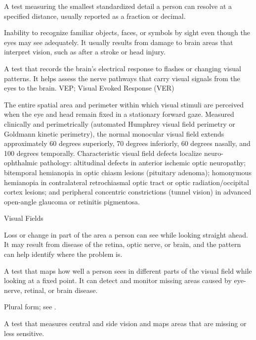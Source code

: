  A test measuring the smallest standardized detail a person can resolve at a specified distance, usually reported as a fraction or decimal.

 Inability to recognize familiar objects, faces, or symbols by sight even though the eyes may see adequately. It usually results from damage to brain areas that interpret vision, such as after a stroke or head injury.

 A test that records the brain’s electrical response to flashes or changing visual patterns. It helps assess the nerve pathways that carry visual signals from the eyes to the brain.
\synonyms
VEP; Visual Evoked Response (VER)

 The entire spatial area and perimeter within which visual stimuli are perceived when the eye and head remain fixed in a stationary forward gaze. Measured clinically and perimetrically (automated Humphrey visual field perimetry or Goldmann kinetic perimetry), the normal monocular visual field extends approximately 60 degrees superiorly, 70 degrees inferiorly, 60 degrees nasally, and 100 degrees temporally. Characteristic visual field defects localize neuro-ophthalmic pathology: altitudinal defects in anterior ischemic optic neuropathy; bitemporal hemianopia in optic chiasm lesions (pituitary adenoma); homonymous hemianopia in contralateral retrochiasmal optic tract or optic radiation/occipital cortex lesions; and peripheral concentric constrictions (tunnel vision) in advanced open-angle glaucoma or retinitis pigmentosa.

\synonyms
Visual Fields

 Loss or change in part of the area a person can see while looking straight ahead. It may result from disease of the retina, optic nerve, or brain, and the pattern can help identify where the problem is.

 A test that maps how well a person sees in different parts of the visual field while looking at a fixed point. It can detect and monitor missing areas caused by eye-nerve, retinal, or brain disease.

 Plural form; see .

 A test that measures central and side vision and maps areas that are missing or less sensitive.

